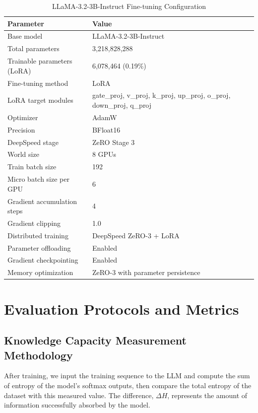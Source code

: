 \documentclass{article} %
\begin{document}
\begin{table}[h]
\centering
\caption{LLaMA-3.2-3B-Instruct Fine-tuning Configuration}
\begin{tabular}{ll}
\toprule
\textbf{Parameter} & \textbf{Value} \\
\midrule
Base model & LLaMA-3.2-3B-Instruct \\
Total parameters & 3,218,828,288 \\
Trainable parameters (LoRA) & 6,078,464 (0.19\%) \\
Fine-tuning method & LoRA \\
LoRA target modules & gate\_proj, v\_proj, k\_proj, up\_proj, o\_proj, down\_proj, q\_proj \\
\midrule
Optimizer & AdamW \\
Precision & BFloat16 \\
DeepSpeed stage & ZeRO Stage 3 \\
World size & 8 GPUs \\
Train batch size & 192 \\
Micro batch size per GPU & 6 \\
Gradient accumulation steps & 4 \\
Gradient clipping & 1.0 \\
\midrule
Distributed training & DeepSpeed ZeRO-3 + LoRA \\
Parameter offloading & Enabled \\
Gradient checkpointing & Enabled \\
Memory optimization & ZeRO-3 with parameter persistence \\
\bottomrule
\end{tabular}
\label{tab:llama_tr}
\end{table}




\section{Evaluation Protocols and Metrics} \label{sec:evaluation}

\subsection{Knowledge Capacity Measurement Methodology} \label{subsec:knowledge_eval}

After training, we input the training sequence to the LLM and compute the sum of entropy of the model's softmax outputs, then compare the total entropy of the dataset with this measured value. The difference, $\Delta H$, represents the amount of information successfully absorbed by the model.
\end{document}
